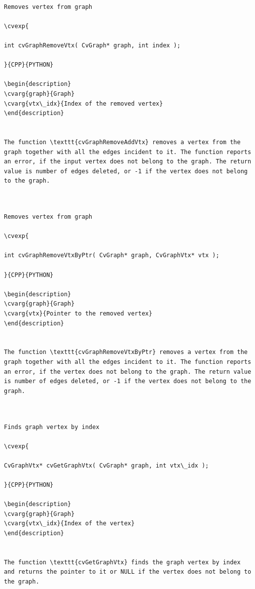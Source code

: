 \begin{verbatim}

Removes vertex from graph

\cvexp{

int cvGraphRemoveVtx( CvGraph* graph, int index );

}{CPP}{PYTHON}

\begin{description}
\cvarg{graph}{Graph}
\cvarg{vtx\_idx}{Index of the removed vertex}
\end{description}


The function \texttt{cvGraphRemoveAddVtx} removes a vertex from the graph together with all the edges incident to it. The function reports an error, if the input vertex does not belong to the graph. The return value is number of edges deleted, or -1 if the vertex does not belong to the graph.


\end{verbatim}
\label{GraphRemoveVtxByPtr}
\begin{verbatim}

Removes vertex from graph

\cvexp{

int cvGraphRemoveVtxByPtr( CvGraph* graph, CvGraphVtx* vtx );

}{CPP}{PYTHON}

\begin{description}
\cvarg{graph}{Graph}
\cvarg{vtx}{Pointer to the removed vertex}
\end{description}


The function \texttt{cvGraphRemoveVtxByPtr} removes a vertex from the graph together with all the edges incident to it. The function reports an error, if the vertex does not belong to the graph. The return value is number of edges deleted, or -1 if the vertex does not belong to the graph.


\end{verbatim}
\label{GetGraphVtx}
\begin{verbatim}

Finds graph vertex by index

\cvexp{

CvGraphVtx* cvGetGraphVtx( CvGraph* graph, int vtx\_idx );

}{CPP}{PYTHON}

\begin{description}
\cvarg{graph}{Graph}
\cvarg{vtx\_idx}{Index of the vertex}
\end{description}


The function \texttt{cvGetGraphVtx} finds the graph vertex by index and returns the pointer to it or NULL if the vertex does not belong to the graph.


\end{verbatim}

